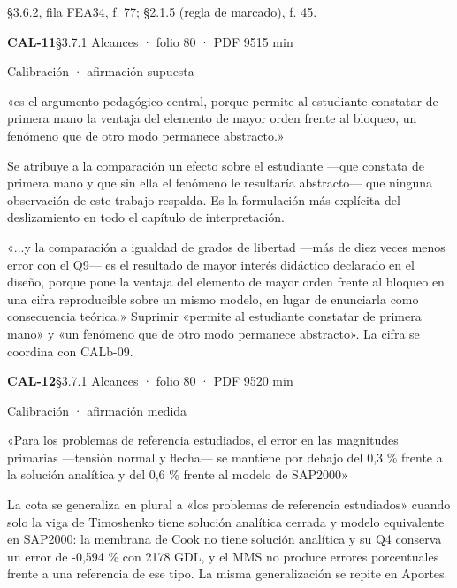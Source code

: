 {\small{}§3.6.2, fila FEA34, f. 77; §2.1.5 (regla de marcado), f. 45.\par}
\vspace{6pt}
\noindent\casilla\textbf{CAL-11}\quad{}\quad §3.7.1 Alcances · folio 80 · PDF 95\hfill 15 min\par\vspace{1pt}
{\small\color{gris}Calibración · afirmación supuesta}\par
\begin{dice}«es el argumento pedagógico central, porque permite al estudiante constatar de primera mano la ventaja del elemento de mayor orden frente al bloqueo, un fenómeno que de otro modo permanece abstracto.»\end{dice}
{\small{}Se atribuye a la comparación un efecto sobre el estudiante —que constata de primera mano y que sin ella el fenómeno le resultaría abstracto— que ninguna observación de este trabajo respalda. Es la formulación más explícita del deslizamiento en todo el capítulo de interpretación.\par}
\begin{debedecir}«...y la comparación a igualdad de grados de libertad —más de diez veces menos error con el Q9— es el resultado de mayor interés didáctico declarado en el diseño, porque pone la ventaja del elemento de mayor orden frente al bloqueo en una cifra reproducible sobre un mismo modelo, en lugar de enunciarla como consecuencia teórica.» Suprimir «permite al estudiante constatar de primera mano» y «un fenómeno que de otro modo permanece abstracto». La cifra se coordina con CALb-09.\end{debedecir}
\vspace{6pt}
\noindent\casilla\textbf{CAL-12}\quad{}\quad §3.7.1 Alcances · folio 80 · PDF 95\hfill 20 min\par\vspace{1pt}
{\small\color{gris}Calibración · afirmación medida}\par
\begin{dice}«Para los problemas de referencia estudiados, el error en las magnitudes primarias —tensión normal y flecha— se mantiene por debajo del 0,3 \% frente a la solución analítica y del 0,6 \% frente al modelo de SAP2000»\end{dice}
{\small{}La cota se generaliza en plural a «los problemas de referencia estudiados» cuando solo la viga de Timoshenko tiene solución analítica cerrada y modelo equivalente en SAP2000: la membrana de Cook no tiene solución analítica y su Q4 conserva un error de -0,594 \% con 2178 GDL, y el MMS no produce errores porcentuales frente a una referencia de ese tipo. La misma generalización se repite en Aportes.\par}
